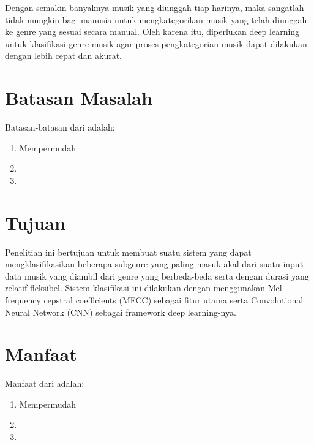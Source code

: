Dengan semakin banyaknya musik yang diunggah tiap harinya, maka sangatlah tidak mungkin bagi manusia untuk mengkategorikan musik yang telah diunggah ke genre yang sesuai secara manual. Oleh karena itu, diperlukan deep learning untuk klasifikasi genre musik agar proses pengkategorian musik dapat dilakukan dengan lebih cepat dan akurat.

\section{Batasan Masalah}
\label{sec:batasanmasalah}

Batasan-batasan dari \lipsum[1][1-3] adalah:

\begin{enumerate}[nolistsep]

  \item Mempermudah \lipsum[2][1-3]

  \item \lipsum[3][1-5]

  \item \lipsum[4][1-5]

\end{enumerate}

\section{Tujuan}
\label{sec:Tujuan}

Penelitian ini bertujuan untuk membuat suatu sistem yang dapat mengklasifikasikan beberapa subgenre yang paling masuk akal dari suatu input data musik yang diambil dari genre yang berbeda-beda serta dengan durasi yang relatif fleksibel. Sistem klasifikasi ini dilakukan dengan menggunakan Mel-frequency cepstral coefficients (MFCC) sebagai fitur utama serta Convolutional Neural Network (CNN) sebagai framework deep learning-nya.

\section{Manfaat}
\label{sec:manfaat}

Manfaat dari \lipsum[1][1-3] adalah:

\begin{enumerate}[nolistsep]

  \item Mempermudah \lipsum[2][1-3]

  \item \lipsum[3][1-5]

  \item \lipsum[4][1-5]

\end{enumerate}

